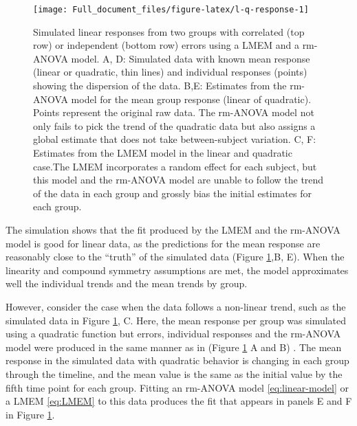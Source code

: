 \documentclass[
]{article}
\begin{document}
\begin{figure}[H]

{\centering \texttt{[image: Full\_document\_files/figure-latex/l-q-response-1]} 

}

\caption{Simulated linear responses from two groups with correlated (top row) or independent (bottom row) errors using a LMEM and a rm-ANOVA model. A, D: Simulated data with known mean response (linear or quadratic, thin lines) and individual responses (points) showing the dispersion of the data. B,E: Estimates from the rm-ANOVA model for the mean group response (linear of quadratic). Points represent the original raw data. The rm-ANOVA model not only fails to pick the trend of the quadratic data but also assigns a global estimate that does not take between-subject variation. C, F: Estimates from the LMEM model in the linear and quadratic case.The LMEM incorporates a random effect for each subject, but this model and the rm-ANOVA model are unable to follow the trend of the data in each group and grossly bias the initial estimates for each group.}\label{fig:l-q-response}
\end{figure}

The simulation shows that the fit produced by the LMEM and the rm-ANOVA model is good for linear data, as the predictions for the mean response are reasonably close to the ``truth'' of the simulated data (Figure \ref{fig:l-q-response},B, E). When the linearity and compound symmetry assumptions are met, the model approximates well the individual trends and the mean trends by group.

However, consider the case when the data follows a non-linear trend, such as the simulated data in Figure \ref{fig:l-q-response}, C. Here, the mean response per group was simulated using a quadratic function but errors, individual responses and the rm-ANOVA model were produced in the same manner as in (Figure \ref{fig:l-q-response} A and B) . The mean response in the simulated data with quadratic behavior is changing in each group through the timeline, and the mean value is the same as the initial value by the fifth time point for each group. Fitting an rm-ANOVA model \eqref{eq:linear-model} or a LMEM \eqref{eq:LMEM} to this data produces the fit that appears in panels E and F in Figure \ref{fig:l-q-response}.
\end{document}
